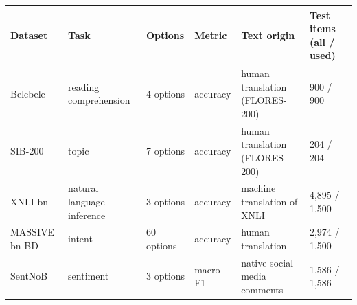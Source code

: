 \begin{tabular}{@{}llllll@{}}\toprule
Dataset & Task & Options & Metric & Text origin & Test items (all / used) \\\midrule
Belebele & reading comprehension & 4 options & accuracy & human translation (FLORES-200) & 900 / 900 \\
SIB-200 & topic & 7 options & accuracy & human translation (FLORES-200) & 204 / 204 \\
XNLI-bn & natural language inference & 3 options & accuracy & machine translation of XNLI & 4,895 / 1,500 \\
MASSIVE bn-BD & intent & 60 options & accuracy & human translation & 2,974 / 1,500 \\
SentNoB & sentiment & 3 options & macro-F1 & native social-media comments & 1,586 / 1,586 \\
\bottomrule\end{tabular}
